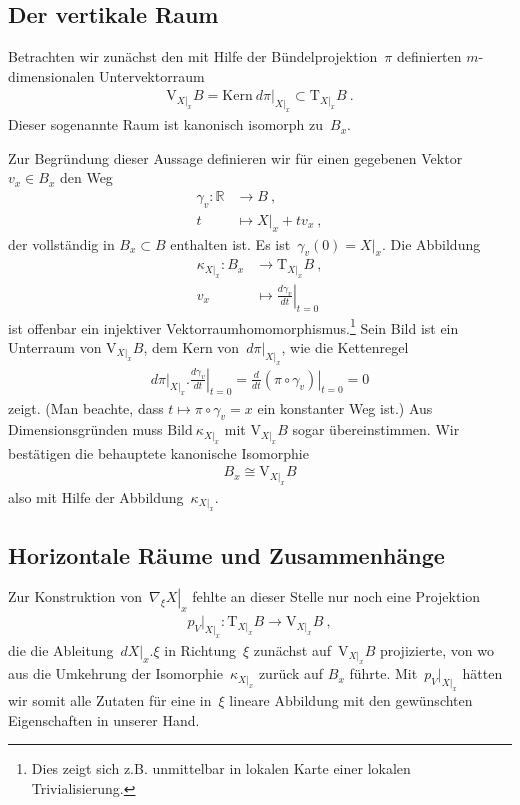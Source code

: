 \documentclass[10pt,a4paper]{article}
\newcommand{\mydef}[1]{\textls{#1}}
\begin{document}
\subsection{Der vertikale Raum}
Betrachten wir zunächst den mit Hilfe der Bündelprojektion~$\pi$ definierten $m$-dimensionalen Untervektorraum
\begin{align*}
\mathrm{V}_{X|_x}B = \mathrm{Kern}\ d\pi|_{X|_x} \subset \mathrm{T}_{X|_x} B
\ .
\end{align*}
Dieser sogenannte \mydef{vertikale} Raum ist kanonisch isomorph zu~$B_x$.

Zur Begründung dieser Aussage definieren wir für einen gegebenen Vektor~$v_x\in B_x$ den Weg
\begin{align*}
\gamma_v: \mathbb{R} &\rightarrow B
\ ,\nonumber\\
t &\mapsto X|_x + tv_x
\ ,
\end{align*}
der vollständig in $B_x\subset B$ enthalten ist.
Es ist~$\gamma_v(0) = X|_x$.
Die Abbildung
\begin{align*}
\kappa_{X|_x}: B_x&\rightarrow\mathrm{T}_{X|_x}B
\ ,\nonumber\\
v_x &\mapsto \left.\frac{d\gamma_v}{dt}\right|_{t=0}
\end{align*}
ist offenbar ein injektiver Vektorraum\-homomorphismus.\footnote{Dies zeigt sich z.B. unmittelbar in lokalen Karte einer lokalen Trivialisierung.} 
Sein Bild ist ein Unterraum von $\mathrm{V}_{X|_x}B$, dem Kern von~$d\pi|_{X|_x}$, wie die Kettenregel
\begin{align*}
d\pi|_{X|_x} . \left.\frac{d\gamma_v}{dt}\right|_{t=0}
= 
\left.\frac{d}{dt}
\left(
\pi\circ\gamma_v
\right)
\right|_{t=0} = 0
\end{align*}
zeigt.
(Man beachte, dass $t\mapsto\pi\circ\gamma_v=x$ ein konstanter Weg ist.) 
Aus Dimensions\-gründen muss $\mathrm{Bild}\ \kappa_{X|_x}$ mit $\mathrm{V}_{X|_x}B$ sogar übereinstimmen.
Wir bestätigen die behauptete kanonische Isomorphie
\begin{align*}
B_x \cong \mathrm{V}_{X|_x}B
\end{align*}
also mit Hilfe der Abbildung~$\kappa_{X|_x}$.

\subsection{Horizontale Räume und Zusammenhänge}
\label{ssec:horizontal}

Zur Konstruktion von~$\left.\nabla_\xi X\right|_x$ fehlte an dieser Stelle nur noch eine Projektion
\begin{align*}
p_V|_{X|_x}: \mathrm{T}_{X|_x} B\rightarrow\mathrm{V}_{X|_x}B
\ ,
\end{align*}
die die Ableitung~$dX|_x.\xi$ in Richtung~$\xi$ zunächst auf~$\mathrm{V}_{X|_x}B$ projizierte, von wo aus die Umkehrung der Isomorphie~$\kappa_{X|_x}$ zurück auf $B_x$ führte.
Mit~$p_V|_{X|_x}$ hätten wir somit alle Zutaten für eine in~$\xi$ lineare Abbildung mit den gewünschten Eigenschaften in unserer Hand.
\end{document}
